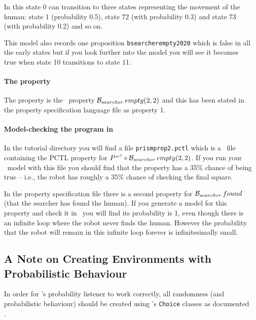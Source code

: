 In this state 0 can transition to three states representing the movement of the human: state 1 (probability 0.5), state 72 (with probability 0.3) and state 73 (with probability 0.2) and so on.

This model also records one proposition \texttt{bsearcherempty2020} which is false in all the early states but if you look further into the model you will see it becomes true when state 10 transitions to state 11.

\paragraph{The property} The property is the \ajpf\ property $\mathrm{{\cal B}}_{searcher} \, empty(2, 2)$ and this has been stated in the property specification language file as property 1. 

\paragraph{Model-checking the program in \prism}  In the tutorial directory you will find a file \texttt{prismprop2.pctl} which is a \prism\ file containing the PCTL property for $P^{=?}\diamond \mathrm{{\cal B}}_{searcher} \, empty(2, 2)$.  If you run your \prism\ model with this file you should find that the property has a 35\% chance of being true -- i.e., the robot has roughly a 35\% chance of checking the final square.

In the property specification file there is a second property for $\mathrm{{\cal B}}_{searcher} \, found$ (that the searcher has found the human).  If you generate a model for this property and check it in \prism\ you will find its probability is 1, even though there is an infinite loop where the robot never finds the human.   However the probability that the robot will remain in this infinite loop forever is infinitesimally small.

\subsection{A Note on Creating Environments with Probabilistic Behaviour}

In order for \ajpf's probability listener to work correctly, all randomness (and probabilistic behaviour) should be created using \ail's \texttt{Choice} classes as documented .  

